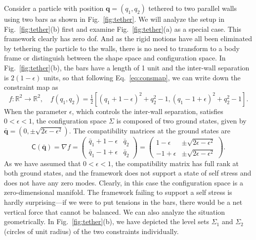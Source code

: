 \begin{example*}
  Consider a particle with position $\bm{q} = (q_{1}, q_{2})$ tethered to two parallel walls using two bars as shown in Fig.~\ref{fig:tether}.
  We will analyze the setup in Fig.~\ref{fig:tether}(b) first and examine Fig.~\ref{fig:tether}(a)
  as a special case.
This framework clearly has zero \ac{dof}.
And as the rigid motions have all been eliminated by tethering the particle to the walls, there is no need to transform to a body frame or distinguish between the shape space and configuration space.
  In Fig.~\ref{fig:tether}(b), the bars have a length of 1 unit and the inter-wall separation is $2(1 - \epsilon)$ units, so that following Eq.~\eqref{eq:consmap}, we can write down the constraint map as
%
\begin{equation}
  f: \mathbb{R}^{2} \to \mathbb{R}^{2},
  \quad
  f(q_{1}, q_{2}) = \tfrac{1}{2}\left[(q_{1} + 1 - \epsilon)^{2} + q_{2}^{2} - 1, (q_{1}-1 + \epsilon)^{2} + q_{2}^{2} - 1\right].
\end{equation}
%
When the parameter $\epsilon$, which controls the inter-wall separation, satisfies $0 < \epsilon < 1$, the configuration space $\Sigma$ is composed of two ground states, given by $\bar{\bm{q}} = (0, \pm\sqrt{2\epsilon - \epsilon^{2}})$.
%
The compatibility matrices at the ground states are
%
\begin{equation}
  \mathsf{C}(\bar{\bm{q}}) = \nabla f = \begin{pmatrix}
    \bar{q}_{1} + 1 - \epsilon & \bar{q}_{2}\\
    \bar{q}_{1} - 1 + \epsilon & \bar{q}_{2}
  \end{pmatrix}
  =
  \begin{pmatrix}
     1-\epsilon & \pm\sqrt{2\epsilon - \epsilon^{2}}\\
    -1+\epsilon & \pm\sqrt{2\epsilon - \epsilon^{2}}
  \end{pmatrix}.
\end{equation}
%
As we have assumed that $0 < \epsilon < 1$, the compatibility matrix has full rank at both ground states, and the framework does not support a state of self stress and does not have any zero modes.
Clearly, in this case the configuration space is a zero-dimensional manifold.
The framework failing to support a self stress is hardly surprising---if we were to put tensions in the bars, there would be a net vertical force that cannot be balanced.
We can also analyze the situation geometrically.
In Fig.~\ref{fig:tether}(b), we have depicted the level sets $\Sigma_{1}$ and $\Sigma_{2}$ (circles of unit radius) of the two constraints individually.

\end{example*}
